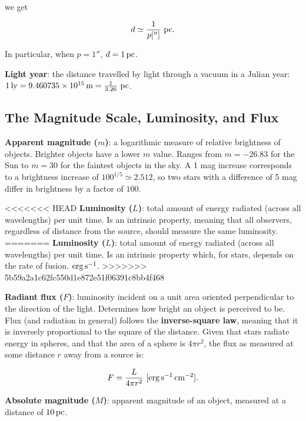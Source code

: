\documentclass[a4paper,10pt]{article}
\begin{document}
we get

\begin{align*}
    d \simeq \frac{1}{p['']}~{\rm pc}.
\end{align*}

In particular, when $p = 1''$, $d = 1\,{\rm pc}$.

\textbf{Light year}: the distance travelled by light through a vacuum in a Julian year: $1\,{\rm ly} = 9.460735\times 10^{15}\,{\rm m} = \frac{1}{3.26}~{\rm pc}$.

\subsection{The Magnitude Scale, Luminosity, and Flux}

\textbf{Apparent magnitude ($m$)}: a logarithmic measure of relative brightness of objects. Brighter objects have a lower $m$ value. Ranges from $m=-26.83$ for the Sun to $m=30$ for the faintest objects in the sky. A 1 mag increase corresponds to a brightness increase of $100^{1/5} \simeq 2.512$, so two stars with a difference of 5 mag differ in brightness by a factor of $100$. 

<<<<<<< HEAD
\textbf{Luminosity ($L$)}: total amount of energy radiated (across all wavelengths) per unit time. Is an intrinsic property, meaning that all observers, regardless of distance from the source, should measure the same luminosity.
=======
\textbf{Luminosity ($L$)}: total amount of energy radiated (across all wavelengths) per unit time. Is an intrinsic property which, for stars, depends on the rate of fusion. $\rm erg\,s^{-1}$. 
>>>>>>> 5b59a2a1c62fc550d1e872e51f06391c8bb4f468

\textbf{Radiant flux ($F$)}: luminosity incident on a unit area oriented perpendicular to the direction of the light. Determines how bright an object is perceived to be. Flux (and radiation in general) follows the \textbf{inverse-square law}, meaning that it is inversely proportional to the square of the distance. Given that stars radiate energy in spheres, and that the area of a sphere is $4\pi r^2$, the flux as measured at some distance $r$ away from a source is:

\begin{align*}
    F = \frac{L}{4\pi r^2}~[{\rm erg\,s^{-1}\,cm^{-2}}].
\end{align*}

\textbf{Absolute magnitude ($M$)}: apparent magnitude of an object, measured at a distance of $10\,{\rm pc}$.
\end{document}
